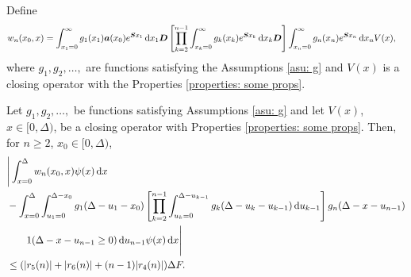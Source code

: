 Define 
\begin{align}
		w_n(x_0,x) &= \int_{x_1=0}^\infty g_1(x_1) \boldsymbol a (x_0) e^{\boldsymbol{S}x_1}\, \mathrm{d} x_1\boldsymbol D 
            	\left[\prod_{k=2}^{n-1}\int_{x_k=0}^\infty g_k(x_k) e^{\boldsymbol{S}x_k} \, \mathrm{d} x_k \boldsymbol D\right] \int_{x_n=0}^\infty g_{n}(x_n) e^{\boldsymbol{S}x_n} \, \mathrm{d} x_n V(x), \nonumber 
\end{align}
where \(g_1,g_2,\dots,\) are functions satisfying the Assumptions \ref{asu: g} and \(V(x)\) is a closing operator with the Properties \ref{properties: some props}. %

\begin{cor}
	 Let \(g_1,g_2,\dots,\) be functions satisfying Assumptions \ref{asu: g} and let \(V(x)\), \(x\in[0,\Delta)\), be a closing operator with Properties \ref{properties: some props}. Then, for \(n\geq 2\), \(x_0\in[0,\Delta)\), 
	\begin{align}
		&\Bigg| \int_{x=0}^\Delta w_n(x_0,x) \psi(x) \, \mathrm{d} x \nonumber 
		\\&{}- \int_{x=0}^\Delta \int_{u_1=0}^{\Delta-x_0}g_1(\Delta - u_1 - x_0)
		\left[\prod_{k=2}^{n-1} \int_{u_k=0}^{\Delta-u_{k-1}} g_k(\Delta-u_k-u_{k-1})\, \mathrm{d} u_{k-1}\right] \nonumber 
            	g_{n}(\Delta - x-u_{n-1})
	\\&\qquad{} 1(\Delta-x-u_{n-1}\geq0) \, \mathrm{d} u_{n-1}\psi(x) \, \mathrm{d} x \Bigg| \nonumber
		\\&\leq (|r_5(n)| + |r_6(n)| + (n-1)|r_4(n)|)\Delta F. \label{eqn: rhs g 4dvfklsmv}
	\end{align}
\end{cor}
